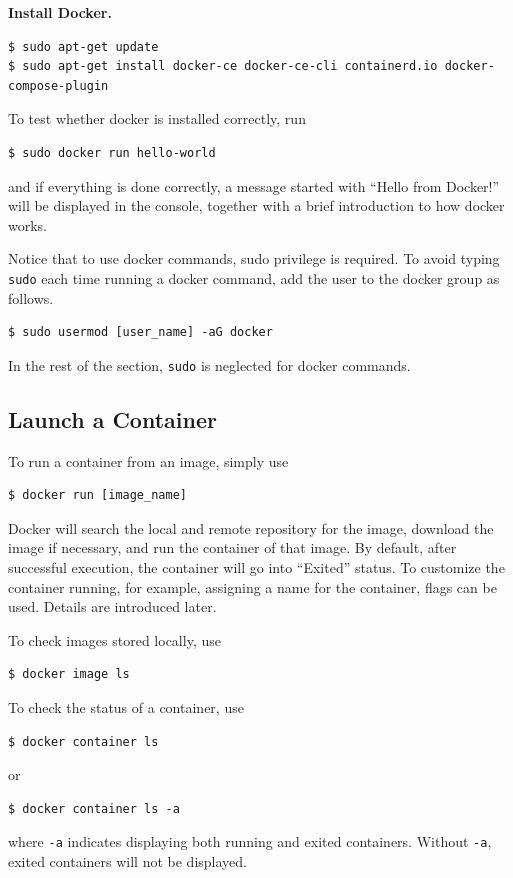 \vspace{0.1in}
\noindent \textbf{Install Docker.}
\begin{lstlisting}
$ sudo apt-get update
$ sudo apt-get install docker-ce docker-ce-cli containerd.io docker-compose-plugin
\end{lstlisting}

To test whether docker is installed correctly, run
\begin{lstlisting}
$ sudo docker run hello-world
\end{lstlisting}
and if everything is done correctly, a message started with ``Hello from Docker!'' will be displayed in the console, together with a brief introduction to how docker works.

Notice that to use docker commands, sudo privilege is required. To avoid typing \verb|sudo| each time running a docker command, add the user to the docker group as follows.
\begin{lstlisting}
$ sudo usermod [user_name] -aG docker
\end{lstlisting}

In the rest of the section, \verb|sudo| is neglected for docker commands.

\subsection{Launch a Container}

To run a container from an image, simply use
\begin{lstlisting}
$ docker run [image_name]
\end{lstlisting}
Docker will search the local and remote repository for the image, download the image if necessary, and run the container of that image. By default, after successful execution, the container will go into ``Exited'' status. To customize the container running, for example, assigning a name for the container, flags can be used. Details are introduced later.

To check images stored locally, use
\begin{lstlisting}
$ docker image ls
\end{lstlisting}

To check the status of a container, use
\begin{lstlisting}
$ docker container ls
\end{lstlisting}
or
\begin{lstlisting}
$ docker container ls -a
\end{lstlisting}
where \verb|-a| indicates displaying both running and exited containers. Without \verb|-a|, exited containers will not be displayed.

